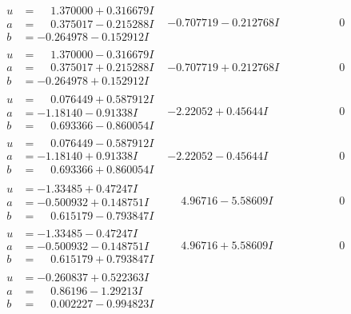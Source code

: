 \documentclass[1p]{elsarticle_modified}
\theoremstyle{definition}
\begin{document}
$$\begin{array}{c|c|c}
\begin{aligned}
u &= \phantom{-}1.370000 + 0.316679 I \\
a &= \phantom{-}0.375017 - 0.215288 I \\
b &= -0.264978 - 0.152912 I\end{aligned}
 & -0.707719 - 0.212768 I & \phantom{-0.000000 } 0 \\ \hline\begin{aligned}
u &= \phantom{-}1.370000 - 0.316679 I \\
a &= \phantom{-}0.375017 + 0.215288 I \\
b &= -0.264978 + 0.152912 I\end{aligned}
 & -0.707719 + 0.212768 I & \phantom{-0.000000 } 0 \\ \hline\begin{aligned}
u &= \phantom{-}0.076449 + 0.587912 I \\
a &= -1.18140 - 0.91338 I \\
b &= \phantom{-}0.693366 - 0.860054 I\end{aligned}
 & -2.22052 + 0.45644 I & \phantom{-0.000000 } 0 \\ \hline\begin{aligned}
u &= \phantom{-}0.076449 - 0.587912 I \\
a &= -1.18140 + 0.91338 I \\
b &= \phantom{-}0.693366 + 0.860054 I\end{aligned}
 & -2.22052 - 0.45644 I & \phantom{-0.000000 } 0 \\ \hline\begin{aligned}
u &= -1.33485 + 0.47247 I \\
a &= -0.500932 + 0.148751 I \\
b &= \phantom{-}0.615179 - 0.793847 I\end{aligned}
 & \phantom{-}4.96716 - 5.58609 I & \phantom{-0.000000 } 0 \\ \hline\begin{aligned}
u &= -1.33485 - 0.47247 I \\
a &= -0.500932 - 0.148751 I \\
b &= \phantom{-}0.615179 + 0.793847 I\end{aligned}
 & \phantom{-}4.96716 + 5.58609 I & \phantom{-0.000000 } 0 \\ \hline\begin{aligned}
u &= -0.260837 + 0.522363 I \\
a &= \phantom{-}0.86196 - 1.29213 I \\
b &= \phantom{-}0.002227 - 0.994823 I\end{aligned}

\end{array}$$
\end{document}
